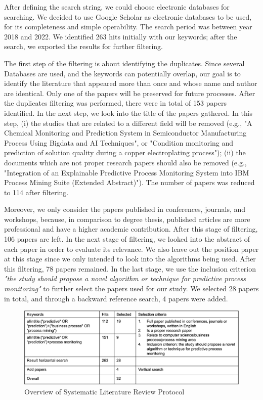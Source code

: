 \documentclass[runningheads]{llncs}
\begin{document}
		After defining the search string, we could choose electronic databases for searching. We decided to use Google Scholar as electronic databases to be used, for its completeness and simple operability. The search period was between year 2018 and 2022. We identified 263 hits initially with our keywords; after the search, we exported the results for further filtering.
		
		The first step of the filtering is about identifying the duplicates. Since several Databases are used, and the keywords can potentially overlap, our goal is to identify the literature that appeared more than once and whose name and author are identical. Only one of the papers will be preserved for future processes. After the duplicates filtering was performed, there were in total of 153 papers identified. In the next step, we look into the title of the papers gathered. In this step, (i) the studies that are related to a different field will be removed (e.g., "A Chemical Monitoring and Prediction System in Semiconductor Manufacturing Process Using Bigdata and AI Techniques", or "Condition monitoring and prediction of solution quality during a copper electroplating process"); (ii) the documents which are not proper research papers should also be removed (e.g., "Integration of an Explainable Predictive Process Monitoring System into IBM Process Mining Suite (Extended Abstract)"). The number of papers was reduced to 114 after filtering.
		
		Moreover, we only consider the papers published in conferences, journals, and workshops, because, in comparison to degree thesis, published articles are more professional and have a higher academic contribution. After this stage of filtering, 106 papers are left. In the next stage of filtering, we looked into the abstract of each paper in order to evaluate its relevance. We also leave out the position paper at this stage since we only intended to look into the algorithms being used. After this filtering, 78 papers remained. In the last stage, we use the inclusion criterion \textit{"the study should propose a novel algorithm or technique for predictive process monitoring"} to further select the papers used for our study. We selected 28 papers in total, and through a backward reference search, 4 papers were added.
		
		\begin{figure}
		\includegraphics[width=\textwidth]{Filtering.png}
		\caption{Overview of Systematic Literature Review Protocol} \label{fig1}
		\end{figure}
		
\end{document}
